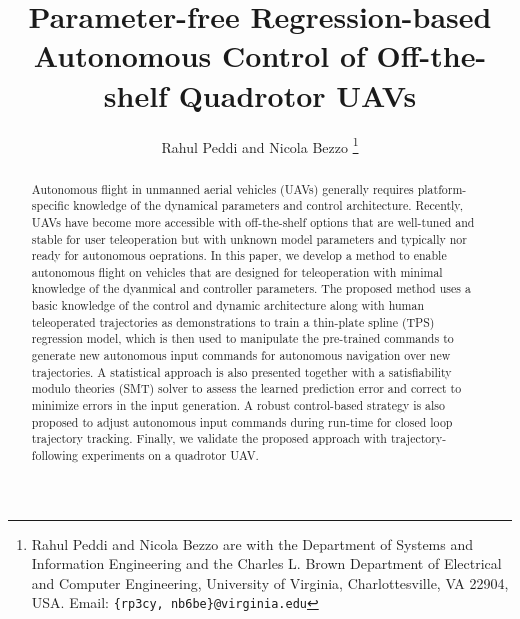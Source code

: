 \documentclass[letterpaper, 10 pt, conference]{ieeeconf}  %
\begin{document}
\title{\LARGE \bf
Parameter-free Regression-based Autonomous Control of Off-the-shelf Quadrotor UAVs
}


\author{Rahul Peddi and Nicola Bezzo%
\thanks{Rahul Peddi and Nicola Bezzo are with the Department of Systems and Information Engineering and the Charles L. Brown Department of Electrical and Computer Engineering, University of Virginia, Charlottesville, VA 22904, USA. Email: {\tt \{rp3cy, nb6be\}@virginia.edu}}}



\maketitle
\thispagestyle{empty}
\pagestyle{empty}


\begin{abstract}
Autonomous flight in unmanned aerial vehicles (UAVs) generally requires platform-specific knowledge of the dynamical parameters and control architecture. Recently, UAVs have become more accessible with off-the-shelf options that are well-tuned and stable for user teleoperation but with unknown model parameters and typically nor ready for autonomous oeprations. In this paper, we develop a method to enable autonomous flight on vehicles that are designed for teleoperation with minimal knowledge of the dyanmical and controller parameters. The proposed method uses a basic knowledge of the control and dynamic architecture along with human teleoperated trajectories as demonstrations to train a thin-plate spline (TPS) regression model, which is then used to manipulate the pre-trained commands to generate new autonomous input commands for autonomous navigation over new trajectories. A statistical approach is also presented together with a satisfiability modulo theories (SMT) solver to assess the learned prediction error and correct to minimize errors in the input generation. A robust control-based strategy is also proposed to adjust autonomous input commands during run-time for closed loop trajectory tracking. Finally, we validate the proposed approach with trajectory-following experiments on a quadrotor UAV.

\end{abstract}


\end{document}
